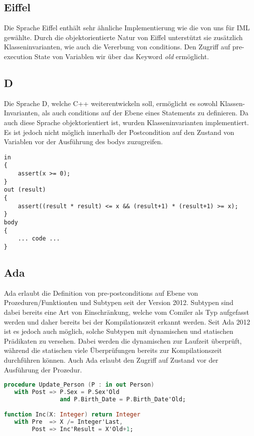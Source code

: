 \subsection{Eiffel}
Die Sprache Eiffel enthält sehr ähnliche Implementierung wie die von uns für IML gewählte. Durch
die objektorientierte Natur von Eiffel unterstützt sie zusätzlich Klasseninvarianten, wie auch die
Vererbung von conditions. Den Zugriff auf pre-execution State von Variablen wir über das 
Keyword \textit{old} ermöglicht.

\subsection{D}
Die Sprache D\cite{D:Main}, welche C++ weiterentwickeln soll, ermöglicht es sowohl Klassen-Invarianten,
als auch conditions auf der Ebene eines Statements zu definieren. Da auch diese Sprache objektorientiert 
ist, wurden Klasseninvarianten implementiert. Es ist jedoch nicht möglich innerhalb der Postcondition 
auf den Zustand von Variablen vor der Ausführung des bodys zuzugreifen.\newline

\begin{lstlisting}[caption=Beispiel in D]
in 
{ 
    assert(x >= 0);
} 
out (result) 
{
    assert((result * result) <= x && (result+1) * (result+1) >= x);
} 
body
{
    ... code ...
}
\end{lstlisting}

\subsection{Ada}
Ada erlaubt die Definition von pre-postconditions auf Ebene von Prozeduren/Funktionten und Subtypen 
seit der Version 2012. Subtypen sind
dabei bereits eine Art von Einschränkung, welche vom Comiler als Typ aufgefasst werden und daher bereits
bei der Kompilationszeit erkannt werden. Seit Ada 2012 ist es jedoch auch möglich, solche Subtypen 
mit dynamischen und statischen Prädikaten zu versehen. Dabei werden die dynamischen zur Laufzeit 
überprüft, während die statischen viele Überprüfungen bereits zur Kompilationszeit
 durchführen können. Auch 
Ada erlaubt den Zugriff auf Zustand vor der Ausführung der Prozedur. \newline

\begin{lstlisting}[caption=Beispiel in Ada 2012,language=Ada]
procedure Update_Person (P : in out Person)
   with Post => P.Sex = P.Sex'Old 
                and P.Birth_Date = P.Birth_Date'Old;

function Inc(X: Integer) return Integer
   with Pre  => X /= Integer'Last,
        Post => Inc'Result = X'Old+1;
\end{lstlisting}
